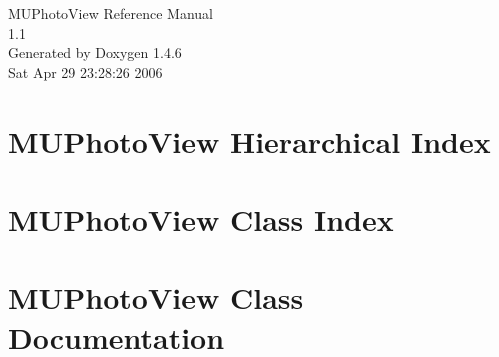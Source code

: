 \documentclass[a4paper]{book}
\begin{document}
\begin{titlepage}
\vspace*{7cm}
\begin{center}
{\Large MUPhoto\-View Reference Manual\\[1ex]\large 1.1 }\\
\vspace*{1cm}
{\large Generated by Doxygen 1.4.6}\\
\vspace*{0.5cm}
{\small Sat Apr 29 23:28:26 2006}\\
\end{center}
\end{titlepage}
\clearemptydoublepage
{}
\tableofcontents
\clearemptydoublepage
{}
\chapter{MUPhoto\-View Hierarchical Index}

\chapter{MUPhoto\-View Class Index}

\chapter{MUPhoto\-View Class Documentation}


\printindex
\end{document}
